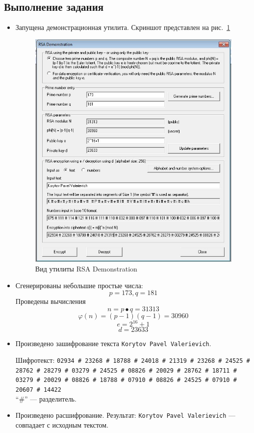 \documentclass[a4paper, 14pt]{extarticle}
\begin{document}
\subsection{Выполнение задания}
\begin{itemize}
    \item Запущена демонстрационная утилита. Скриншот представлен на рис.~\ref{img:b:2}
    \begin{figure}[h]
        \centering
        \includegraphics[width=\textwidth]{img/S004.jpg}
        \caption{Вид утилиты RSA Demonstration}%
        \label{img:b:2}
    \end{figure}
    
    \FloatBarrier{}
    \item Сгенерированы небольшие простые числа:
        \[ p = 173, q = 181 \] 
        Проведены вычисления
        \[ n = p \bullet q = 31313 \]
        \[ \varphi(n) = (p-1)(q-1) = 30960 \]
        \[ e = 2^{16} + 1 \]
        \[ d = 23633 \] 
    \item Произведено зашифрование текста \texttt{Korytov Pavel Valerievich}.

        Шифротекст: \texttt{02934 \# 23268 \# 18788 \# 24018 \# 21319 \# 23268 \# 24525 \# 28762 \# 28279 \# 03279 \# 24525 \# 08826 \# 20029 \# 28762 \# 18711 \# 03279 \# 20029 \# 08826 \# 18788 \# 07910 \# 08826 \# 24525 \# 07910 \# 20607 \# 14422}\\
    ``\#'' --- разделитель.
    
    \item Произведено расшифрование. Результат: \texttt{Korytov Pavel Valerievich} --- совпадает с исходным текстом.
\end{itemize}
\end{document}
